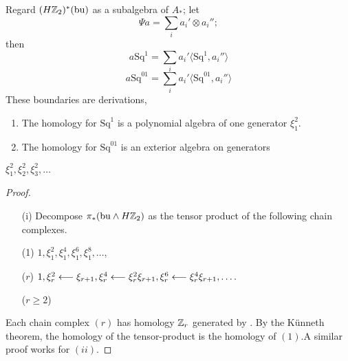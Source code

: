 \documentclass[../main]{subfiles}
\begin{document}
Regard $(H\mathbb{Z}_2)^{\ast}(\mathrm{bu})$ as a subalgebra of $A_{\ast}$; let \begin{equation*}
    \Psi a = \sum_{i}a_{i}'\otimes a_{i}'';
\end{equation*}
then \begin{equation*}
    a\mathrm{Sq}^{1}=\sum_{i}a_{i}'\langle\mathrm{Sq}^{1}, a_{i}''\rangle 
\end{equation*}
\begin{equation*}
    a\mathrm{Sq}^{01}=\sum_{i}a_{i}'\langle\mathrm{Sq}^{01}, a_{i}''\rangle 
\end{equation*}
These boundaries are derivations, 
\begin{lemma}\begin{enumerate}[label=(\roman*)] \label{lem:p3ch16.9}
    \item The homology for $\mathrm{Sq}^{1}$ is a polynomial algebra of one generator $\xi_{1}^{2}$.\\
    \item The homology for $\mathrm{Sq}^{01}$ is an exterior algebra on generators
\end{enumerate} 
 $\xi_{1}^{2}, \xi_{2}^{2}, \xi_{3}^{2}, \dots$
 
\end{lemma}
\begin{proof}
\begin{enumerate}[label=(\roman*)]
    \item[(i)] Decompose $\pi_{\ast}(\mathrm{bu} \wedge H\mathbb{Z}_2)$ as the tensor product of the following chain complexes.
 \end{enumerate}  
    \begin{enumerate}
        \item[(1)] $1, \xi_{1}^{2}, \xi_{1}^{4}, \xi_{1}^{6}, \xi_{1}^{8}, \dots$, 
        
        \item[($r$)] $1, \xi_{r}^{2}\overset{}{\longleftarrow} \xi_{r+1}, \xi_{r}^{4}\overset{}{\longleftarrow} \xi_{r}^{2}\xi_{r+1}, \xi_{r}^{6}\overset{}{\longleftarrow} \xi_{r}^{4}\xi_{r+1}, \dots.$ 
        
        ($r \ge 2$)
    \end{enumerate}
    
    Each chain complex $(r)$ has homology $\mathbb{Z}_{r}$ generated by \cite{adams3}. By the Künneth theorem, the homology of the tensor-product is the homology of $(1)$.A similar proof works for $(ii)$.
    \end{proof}
\end{document}
